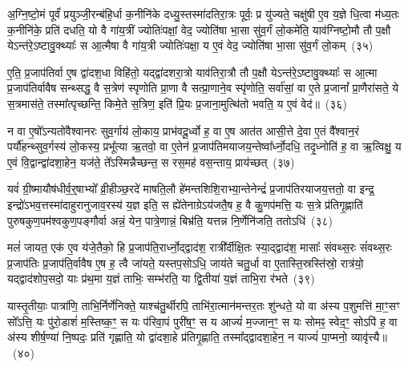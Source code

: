 अ॒ग्नि॒ष्टो॒मं पूर्वं॑ प्रयुञ्जी॒रन्ब॑हि॒र्धा क॒नीनि॑के दध्यु॒स्तस्मा॑दतिरा॒त्रः पूर्वः॒ प्र यु॑ज्यते॒ चक्षु॑षी ए॒व य॒ज्ञे धि॒त्वा म॑ध्य॒तः क॒नीनि॑के॒ प्रति॑ दधति॒ यो वै गा॑य॒त्रीं ज्योतिः॑पक्षां॒ वेद॒ ज्योति॑षा भा॒सा सु॑व॒र्गं लो॒कमे॑ति॒ याव॑ग्निष्टो॒मौ तौ प॒क्षौ ये\-ऽन्त॑रे॒\-ऽष्टावु॒क्थ्याः᳚ स आ॒त्मैषा वै गा॑य॒त्री ज्योतिः॑पक्षा॒ य ए॒वं वेद॒ ज्योति॑षा भा॒सा सु॑व॒र्गं लो॒कम्~(३५)

ए॒ति॒ प्र॒जा\-प॑तिर्वा ए॒ष द्वा॑दश॒धा विहि॑तो॒ यद्द्वा॑दशरा॒त्रो याव॑तिरा॒त्रौ तौ प॒क्षौ ये\-ऽन्त॑रे॒\-ऽष्टावु॒क्थ्याः᳚ स आ॒त्मा प्र॒जा\-प॑तिर्वावैष सन्थ्सद्ध॒ वै स॒त्रेण॑ स्पृणोति प्रा॒णा वै सत्प्रा॒णाने॒व स्पृ॑णोति॒ सर्वा॑सां॒ वा ए॒ते प्र॒जानां᳚ प्रा॒णैरा॑सते॒ ये स॒त्रमास॑ते॒ तस्मा᳚त्पृच्छन्ति॒ किमे॒ते स॒त्रिण॒ इति॑ प्रि॒यः प्र॒जाना॒मुत्थि॑तो भवति॒ य ए॒वं वेद॑॥~(३६)

{\anuvakamend[{अ॒ग्नि॒ष्टो॒मौ यथ्सु॑व॒र्गल्लों॒कं प्रि॒यः प्र॒जानां॒ पञ्च॑ च}]}%

न वा ए॒षो᳚\-ऽन्यतो॑वैश्वानरः सुव॒र्गाय॑ लो॒काय॒ प्राभ॑वदू॒र्ध्वो ह॒ वा ए॒ष आत॑त आसी॒त्ते दे॒वा ए॒तं वै᳚श्वान॒रं पर्यौ॑हन्थ्सुव॒र्गस्य॑ लो॒कस्य॒ प्रभू᳚त्या ऋ॒तवो॒ वा ए॒तेन॑ प्र॒जा\-प॑तिमयाजय॒न्तेष्वा᳚र्ध्नो॒दधि॒ तदृ॒ध्नोति॑ ह॒ वा ऋ॒त्विक्षु॒ य ए॒वं वि॒द्वान्द्वा॑दशा॒हेन॒ यज॑ते॒ ते᳚\-ऽस्मिन्नैच्छन्त॒ स रस॒मह॑ वस॒न्ताय॒ प्राय॑च्छत्~(३७)

यवं॑ ग्री॒ष्मायौष॑धीर्व॒र्॒\mbox{}षाभ्यो᳚ व्री॒हीञ्छ॒रदे॑ माषति॒लौ हे॑मन्तशिशि॒राभ्या॒न्तेनेन्द्रं॑ प्र॒जा\-प॑तिरयाजय॒त्ततो॒ वा इन्द्र॒ इन्द्रो॑\-ऽभव॒त्तस्मा॑दाहुरानुजाव॒रस्य॑ य॒ज्ञ इति॒ स ह्ये॑तेनाग्रे\-ऽय॑जतै॒ष ह॒ वै कु॒णप॑मत्ति॒ यः स॒त्रे प्र॑तिगृ॒ह्णाति॑ पुरुषकुण॒पम॑श्वकुण॒पङ्गौर्वा अन्नं॒ येन॒ पात्रे॒णान्नं॒ बिभ्र॑ति॒ यत्तन्न नि॒र्णेनि॑जति॒ ततो\-ऽधि॑~(३८)

मलं॑ जायत॒ एक॑ ए॒व य॑जे॒तैको॒ हि प्र॒जा\-प॑ति॒रार्ध्नो॒द्द्वाद॑श॒ रात्री᳚र्दीक्षि॒तः स्या॒द्द्वाद॑श॒ मासाः᳚ संवथ्स॒रः सं॑वथ्स॒रः प्र॒जा\-प॑तिः प्र॒जा\-प॑ति॒र्वावैष ए॒ष ह॒ त्वै जा॑यते॒ यस्तप॒सो\-ऽधि॒ जाय॑ते चतु॒र्धा वा ए॒तास्ति॒स्रस्ति॑स्रो॒ रात्र॑यो॒ यद्द्वाद॑शोप॒सदो॒ याः प्र॑थ॒मा य॒ज्ञं ताभिः॒ सम्भ॑रति॒ या द्वि॒तीया॑ य॒ज्ञं ताभि॒रा र॑भते~(३९)

यास्तृ॒तीयाः॒ पात्रा॑णि॒ ताभि॒र्निर्णे॑निक्ते॒ याश्च॑तु॒र्थीरपि॒ ताभि॑रा॒त्मान॑मन्तर॒तः शु॑न्धते॒ यो वा अ॑स्य प॒शुमत्ति॑ मा॒ꣳ॒सꣳ सो᳚\-ऽत्ति॒ यः पु॑रो॒डाशं॑ म॒स्तिष्क॒ꣳ॒ स यः प॑रिवा॒पं पुरी॑ष॒ꣳ॒ स य आज्यं॑ म॒ज्जान॒ꣳ॒ स यः सोमꣴ॒ स्वेद॒ꣳ॒ सो\-ऽपि॑ ह॒ वा अ॑स्य शीर्\mbox{}ष॒ण्या॑ नि॒ष्पदः॒ प्रति॑ गृह्णाति॒ यो द्वा॑दशा॒हे प्र॑तिगृ॒ह्णाति॒ तस्मा᳚द्द्वादशा॒हेन॒ न याज्यं॑ पा॒प्मनो॒ व्यावृ॑त्त्यै॥~(४०)

